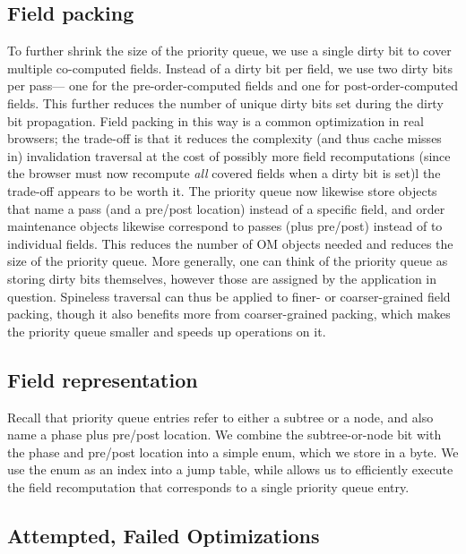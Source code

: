 \subsection{Field packing}

To further shrink the size of the priority queue,
  we use a single dirty bit to cover multiple co-computed fields.
Instead of a dirty bit per field,
  we use two dirty bits per pass---%
  one for the pre-order-computed fields
  and one for post-order-computed fields.
This further reduces the number of unique dirty bits
  set during the dirty bit propagation.
Field packing in this way is a common optimization in real browsers;
  the trade-off is that it reduces the complexity
  (and thus cache misses in) invalidation traversal
  at the cost of possibly more field recomputations
  (since the browser must now recompute \emph{all} covered fields
  when a dirty bit is set)l
  the trade-off appears to be worth it.
The priority queue now likewise store objects
  that name a pass (and a pre/post location)
  instead of a specific field,
  and order maintenance objects likewise correspond
  to passes (plus pre/post) instead of to individual fields.
This reduces the number of OM objects needed
  and reduces the size of the priority queue.
More generally, one can think of the priority queue
  as storing dirty bits themselves,
  however those are assigned by the application in question.
Spineless traversal can thus be applied
  to finer- or coarser-grained field packing,
  though it also benefits more from coarser-grained packing,
  which makes the priority queue smaller and speeds up operations on it.

\subsection{Field representation}

Recall that priority queue entries
  refer to either a subtree or a node,
  and also name a phase plus pre/post location.
We combine the subtree-or-node bit with the phase and pre/post location
  into a simple enum, which we store in a byte.
We use the enum as an index into a jump table,
  while allows us to efficiently execute the field recomputation
  that corresponds to a single priority queue entry.

\subsection{Attempted, Failed Optimizations}

